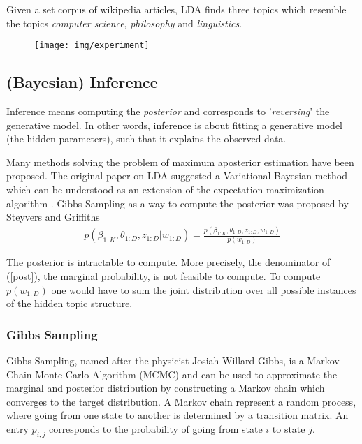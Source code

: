 \documentclass[a4paper,ngerman]{atseminar}
\begin{document}
Given a set corpus of wikipedia articles, LDA finds three topics which resemble the topics \textit{computer science},
\textit{philosophy} and \textit{linguistics}. 


\begin{figure}
\centering
\texttt{[image: img/experiment]}
 \caption{}
   \label{fig:experiments}
\end{figure}

\subsection{(Bayesian) Inference}

Inference means computing the \textit{posterior} and corresponds to '\textit{reversing}' the generative model.
In other words, inference is about fitting a generative model (the hidden parameters), such that it explains the observed data.

Many methods solving the problem of maximum aposterior estimation have been proposed. The original paper on LDA \cite{blei2003latent} suggested a Variational Bayesian method which can be understood as an extension of the expectation-maximization algorithm \cite{fox2012tutorial}. Gibbs Sampling as a way to compute the
posterior was proposed by Steyvers and Griffiths \cite{steyvers2007probabilistic}	 \\




\begin{align*} \label{post}
p(\beta_{1:K}, \theta_{1:D}, z_{1:D} | w_{1:D} ) = \frac{p(\beta_{1:K}, \theta_{1:D}, z_{1:D},w_{1:D} )}{p(w_{1:D})}
\end{align*}

The posterior is intractable to compute. More precisely, the denominator of (\ref{post}), the marginal probability, is not feasible to 
compute. To compute $p(w_{1:D})$ one would have to sum the joint distribution over all possible instances of the hidden topic structure.



\subsubsection{Gibbs Sampling}

Gibbs Sampling, named after the physicist Josiah Willard Gibbs, is a Markov Chain Monte Carlo Algorithm (MCMC) and can be used to approximate the marginal and posterior 
distribution by constructing a Markov chain which converges to the target distribution.
A Markov chain represent a random process, where going from one state to another is determined by a transition matrix.
An entry $p_{i,j}$ corresponds to the probability of going from state $i$ to state $j$.
\end{document}
